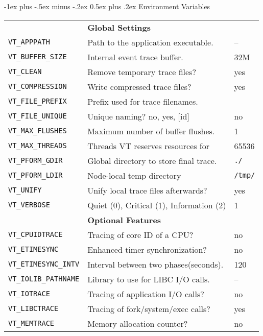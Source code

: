 \documentclass[a4paper,10pt,landscape]{article}
\makeatletter
\renewcommand{\section}{\@startsection{section}{1}{0mm}%
                                {-1ex plus -.5ex minus -.2ex}%
                                {0.5ex plus .2ex}%
                                {\normalfont\large\bfseries}}
\makeatother
\begin{document}
\begin{multicols}{3}
\section{Environment Variables}
\begin{tabular}{@{}l@{}l@{}l@{}}
\texttt{ } & \textbf{Global Settings} & \texttt{ } \\
\texttt{VT\_APPPATH} & Path to the application executable. & -- \\
\texttt{VT\_BUFFER\_SIZE} & Internal event trace buffer. & 32M \\
\texttt{VT\_CLEAN} & Remove temporary trace files? & yes \\
\texttt{VT\_COMPRESSION} & Write compressed trace files?  & yes \\
\texttt{VT\_FILE\_PREFIX} & Prefix used for trace filenames. & \\
\texttt{VT\_FILE\_UNIQUE} & Unique naming? no, yes, [id] & no \\
\texttt{VT\_MAX\_FLUSHES} & Maximum number of buffer flushes. &	1 \\
\texttt{VT\_MAX\_THREADS} & Threads VT reserves resources for &	65536 \\
\texttt{VT\_PFORM\_GDIR} & Global directory to store final trace. & \texttt{./} \\
\texttt{VT\_PFORM\_LDIR} & Node-local temp directory & \texttt{/tmp/} \\
\texttt{VT\_UNIFY} & Unify local trace files afterwards? & yes \\
\texttt{VT\_VERBOSE} & Quiet (0), Critical (1), Information (2) & 1 \\
\texttt{ } & \textbf{Optional Features} & \texttt{ } \\
\texttt{VT\_CPUIDTRACE} & Tracing of core ID of a CPU? & no \\
\texttt{VT\_ETIMESYNC} & Enhanced timer synchronization? & no \\
\texttt{VT\_ETIMESYNC\_INTV} & Interval between two phases(seconds). & 120 \\
\texttt{VT\_IOLIB\_PATHNAME} & Library to use for LIBC I/O calls. & -- \\
\texttt{VT\_IOTRACE} & Tracing of application I/O calls? & no \\
\texttt{VT\_LIBCTRACE} & Tracing of fork/system/exec calls? & yes \\
\texttt{VT\_MEMTRACE} & Memory allocation counter? & no \\

\end{tabular}
\end{multicols}
\end{document}
